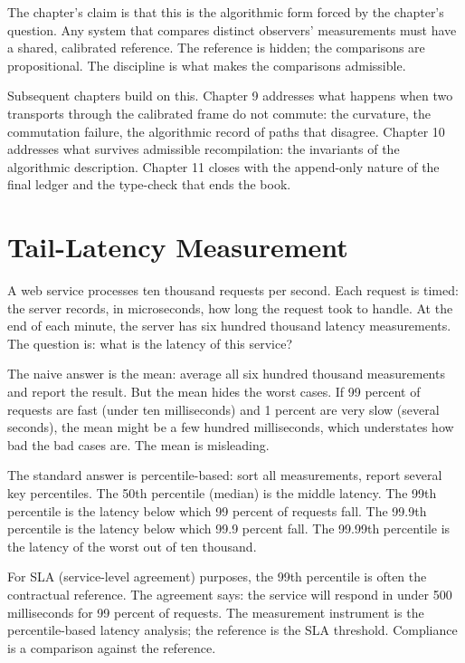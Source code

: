 \begin{chapteressay}
The chapter's claim is that this is the algorithmic form forced by
the chapter's question. Any system that compares distinct
observers' measurements must have a shared, calibrated reference.
The reference is hidden; the comparisons are propositional. The
discipline is what makes the comparisons admissible.

Subsequent chapters build on this. Chapter 9 addresses what
happens when two transports through the calibrated frame do not
commute: the curvature, the commutation failure, the algorithmic
record of paths that disagree. Chapter 10 addresses what survives
admissible recompilation: the invariants of the algorithmic
description. Chapter 11 closes with the append-only nature of the
final ledger and the type-check that ends the book.

\end{chapteressay}

\section{Tail-Latency Measurement}
\label{se:tail-latency-measurement}

A web service processes ten thousand requests per second. Each request
is timed: the server records, in microseconds, how long the request
took to handle. At the end of each minute, the server has six hundred
thousand latency measurements. The question is: what is the latency
of this service?

The naive answer is the mean: average all six hundred thousand
measurements and report the result. But the mean hides the worst
cases. If 99 percent of requests are fast (under ten milliseconds)
and 1 percent are very slow (several seconds), the mean might be a
few hundred milliseconds, which understates how bad the bad cases
are. The mean is misleading.

The standard answer is percentile-based: sort all measurements,
report several key percentiles. The 50th percentile (median) is the
middle latency. The 99th percentile is the latency below which 99
percent of requests fall. The 99.9th percentile is the latency
below which 99.9 percent fall. The 99.99th percentile is the latency
of the worst out of ten thousand.

For SLA (service-level agreement) purposes, the 99th percentile is
often the contractual reference. The agreement says: the service
will respond in under 500 milliseconds for 99 percent of requests.
The measurement instrument is the percentile-based latency analysis;
the reference is the SLA threshold. Compliance is a comparison
against the reference.

